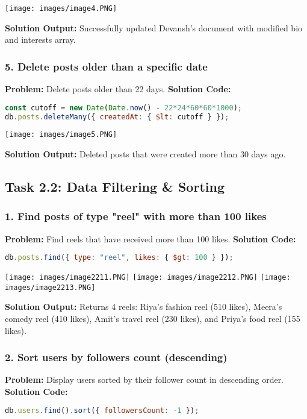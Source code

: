 \documentclass[12pt,a4paper]{article}
\begin{document}
\begin{center}
\texttt{[image: images/image4.PNG]}
\end{center}
\textbf{Solution Output:} Successfully updated Devansh's document with modified bio and interests array.


\subsubsection{5. Delete posts older than a specific date}
\textbf{Problem:} Delete posts older than 22 days.
\textbf{Solution Code:}
\begin{lstlisting}[language=JavaScript]
const cutoff = new Date(Date.now() - 22*24*60*60*1000);
db.posts.deleteMany({ createdAt: { $lt: cutoff } });
\end{lstlisting}

\begin{center}
\texttt{[image: images/image5.PNG]}
\end{center}
\textbf{Solution Output:} Deleted posts that were created more than 30 days ago.


\subsection{Task 2.2: Data Filtering \& Sorting}
\subsubsection{1. Find posts of type "reel" with more than 100 likes}
\textbf{Problem:} Find reels that have received more than 100 likes.
\textbf{Solution Code:}
\begin{lstlisting}[language=JavaScript]
db.posts.find({ type: "reel", likes: { $gt: 100 } });
\end{lstlisting}

\begin{center}
\texttt{[image: images/image2211.PNG]}
\texttt{[image: images/image2212.PNG]}
\texttt{[image: images/image2213.PNG]}
\end{center}
\textbf{Solution Output:} Returns 4 reels: Riya's fashion reel (510 likes), Meera's comedy reel (410 likes), Amit's travel reel (230 likes), and Priya's food reel (155 likes).


\subsubsection{2. Sort users by followers count (descending)}
\textbf{Problem:} Display users sorted by their follower count in descending order.
\textbf{Solution Code:}
\begin{lstlisting}[language=JavaScript]
db.users.find().sort({ followersCount: -1 });
\end{lstlisting}
\end{document}
